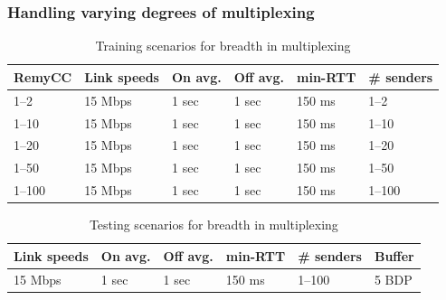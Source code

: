 \begin{frame}
\frametitle{Handling varying degrees of multiplexing}
\begin{table}
\begin{center}
\begin{scriptsize}
\begin{tabular}{l|l|l|l|l|l}
\bf RemyCC & \bf Link speeds & \bf On avg. & \bf Off avg. & \bf min-RTT &
\bf \# senders \\
\hline
1--2     & 15 Mbps & 1 sec & 1 sec & 150 ms & 1--2 \\
1--10    & 15 Mbps & 1 sec & 1 sec & 150 ms & 1--10 \\
1--20    & 15 Mbps & 1 sec & 1 sec & 150 ms & 1--20 \\
1--50    & 15 Mbps & 1 sec & 1 sec & 150 ms & 1--50 \\
1--100   & 15 Mbps & 1 sec & 1 sec & 150 ms & 1--100 \\
\end{tabular}
\end{scriptsize}
\caption{Training scenarios for breadth in multiplexing}
\label{table:multiplexing}
\end{center}
\end{table}

\begin{table}
\begin{center}
\begin{scriptsize}
\begin{tabular}{l|l|l|l|l|l}
\bf Link speeds & \bf On avg. & \bf Off avg. & \bf min-RTT &
\bf \# senders & Buffer \\
\hline
15 Mbps & 1 sec & 1 sec & 150 ms & 1--100 & 5 BDP\\
\end{tabular}
\end{scriptsize}
\caption{Testing scenarios for breadth in multiplexing}
\label{table:muxtesting}
\end{center}
\end{table}

\end{frame}

